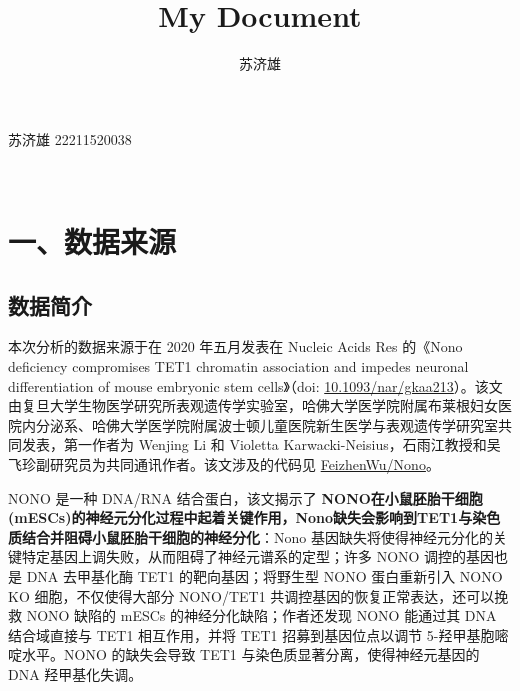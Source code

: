 \documentclass[
  a4paper,
]{article}
\title{My Document}
\author{苏济雄}
\date{}
\renewcommand*\contentsname{Table of contents}
\newcommand\contentsname{Table of contents}
\begin{document}
\maketitle
\ifdefined\Shaded\renewenvironment{Shaded}{\begin{tcolorbox}[interior hidden, breakable, boxrule=0pt, frame hidden, borderline west={3pt}{0pt}{shadecolor}, enhanced, sharp corners]}{\end{tcolorbox}}\fi

\renewcommand*\contentsname{Contents}
{
\hypersetup{linkcolor=}
\setcounter{tocdepth}{2}
\tableofcontents
}
苏济雄 22211520038

‍

\hypertarget{ux4e00ux6570ux636eux6765ux6e90}{%
\section{一、数据来源}\label{ux4e00ux6570ux636eux6765ux6e90}}

\hypertarget{ux6570ux636eux7b80ux4ecb}{%
\subsection{数据简介}\label{ux6570ux636eux7b80ux4ecb}}

本次分析的数据来源于在 2020 年五月发表在 Nucleic Acids Res 的《Nono
deficiency compromises TET1 chromatin association and impedes neuronal
differentiation of mouse embryonic stem cells》（doi:
\href{https://doi.org/10.1093/nar/gkaa213}{10.1093/nar/gkaa213}）。该文由复旦大学生物医学研究所表观遗传学实验室，哈佛大学医学院附属布莱根妇女医院内分泌系、哈佛大学医学院附属波士顿儿童医院新生医学与表观遗传学研究室共同发表，第一作者为
Wenjing Li 和 Violetta
Karwacki-Neisius，石雨江教授和吴飞珍副研究员为共同通讯作者。该文涉及的代码见
\href{https://github.com/FeizhenWu/Nono}{FeizhenWu/Nono}。

NONO 是一种 DNA/RNA 结合蛋白，该文揭示了
\textbf{NONO在小鼠胚胎干细胞(mESCs)的神经元分化过程中起着关键作用，Nono缺失会影响到TET1与染色质结合并阻碍小鼠胚胎干细胞的神经分化}：Nono
基因缺失将使得神经元分化的关键特定基因上调失败，从而阻碍了神经元谱系的定型；许多
NONO 调控的基因也是 DNA 去甲基化酶 TET1 的靶向基因；将野生型 NONO
蛋白重新引入 NONO KO 细胞，不仅使得大部分 NONO/TET1
共调控基因的恢复正常表达，还可以挽救 NONO 缺陷的 mESCs
的神经分化缺陷；作者还发现 NONO 能通过其 DNA 结合域直接与 TET1
相互作用，并将 TET1 招募到基因位点以调节 5-羟甲基胞嘧啶水平。NONO
的缺失会导致 TET1 与染色质显著分离，使得神经元基因的 DNA 羟甲基化失调。
\end{document}
